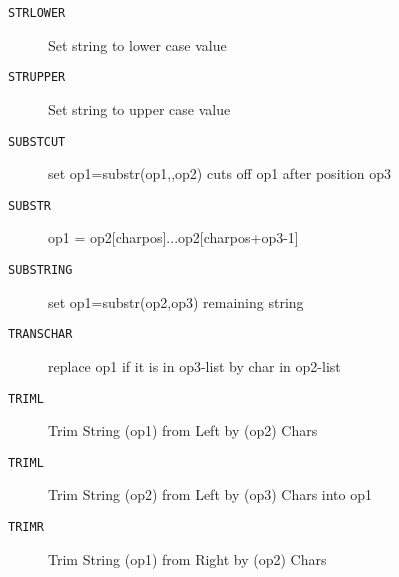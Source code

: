 \begin{description}
\item[\texttt{STRLOWER   }]  Set string to lower case value\\
\end{description}

\begin{description}
\item[\texttt{STRUPPER   }]  Set string to upper case value\\
\end{description}

\begin{description}
\item[\texttt{SUBSTCUT   }]  set op1=substr(op1,,op2) cuts off op1 after position op3\\
\end{description}

\begin{description}
\item[\texttt{SUBSTR     }]  op1 = op2[charpos]...op2[charpos+op3-1]\\
\end{description}

\begin{description}
\item[\texttt{SUBSTRING  }]  set op1=substr(op2,op3) remaining string\\
\end{description}

\begin{description}
\item[\texttt{TRANSCHAR  }]  replace op1 if it is in op3-list by char in op2-list\\
\end{description}

\begin{description}
\item[\texttt{TRIML      }]  Trim String (op1) from Left by (op2) Chars\\
\end{description}

\begin{description}
\item[\texttt{TRIML      }]  Trim String (op2) from Left by (op3) Chars into op1\\
\end{description}

\begin{description}
\item[\texttt{TRIMR      }]  Trim String (op1) from Right by (op2) Chars\\
\end{description}
